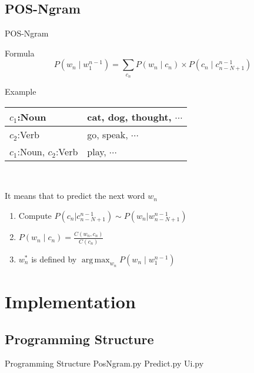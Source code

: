 \documentclass{beamer}
\DeclareMathOperator*{\argmax}{arg\,max}
\begin{document}
\subsection{POS-Ngram}
\begin{frame}{POS-Ngram}
    \begin{block}{Formula}
        $$P(w_n\mid w_1^{n-1}) = \sum_{c_n}P(w_n\mid c_n)\times P(c_n\mid c_{n-N+1}^{n-1})$$
    \end{block}
    \begin{block}{Example}
        \centering
        \begin{tabular}{|l|l|}
            \hline
            $c_1$:Noun & cat, dog, thought, $\cdots$\\\hline
            $c_2$:Verb & go, speak, $\cdots$\\\hline
            $c_1$:Noun, $c_2$:Verb & play, $\cdots$\\\hline
        \end{tabular}\\
    \end{block}

    \flushleft
    It means that to predict the next word $w_n$
    \begin{enumerate}
        \item Compute $P(c_n|c_{n-N+1}^{n-1}) \sim P(w_n|w_{n-N+1}^{n-1})$ 
        \item $P(w_n\mid c_n)=\frac{C(w_n,c_n)}{C(c_n)}$
        \item $w_n^\ast$ is defined by $\argmax_{w_n} P(w_n\mid w_1^{n-1})$
    \end{enumerate}
\end{frame}
\section{Implementation}
\subsection{Programming Structure}
\begin{frame}{Programming Structure}
    PosNgram.py
    Predict.py
    Ui.py
\end{frame}
\end{document}
